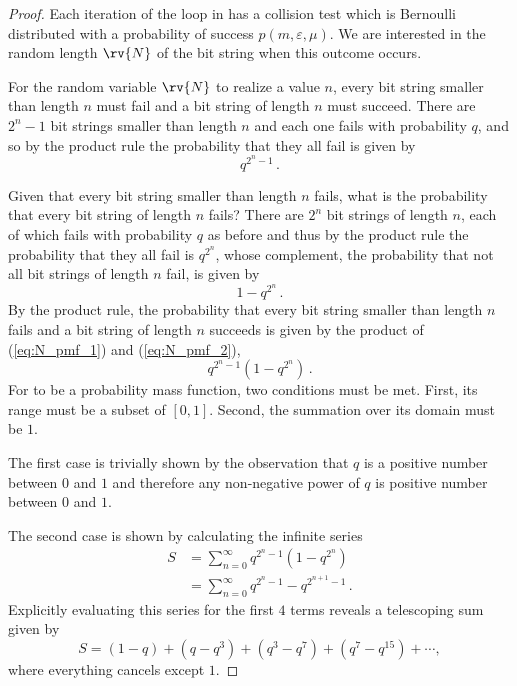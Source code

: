 \documentclass{article}
\begin{document}
\begin{proof}
Each iteration of the loop in  has a collision test which is Bernoulli distributed with a probability of success $p(m,\varepsilon,\mu)$. We are interested in the random length $\rv{N}$ of the bit string when this outcome occurs.

For the random variable $\rv{N}$ to realize a value $n$, every bit string smaller than length $n$ must fail and a bit string of length $n$ must succeed. There are $2^n-1$ bit strings smaller than length $n$ and each one fails with probability $q$, and so by the product rule the probability that they all fail is given by
\begin{equation}
\label{eq:N_pmf_1}
    q^{2^n - 1}\,.
\end{equation}

Given that every bit string smaller than length $n$ fails, what is the probability that every bit string of length $n$ fails? There are $2^n$ bit strings of length $n$, each of which fails with probability $q$ as before and thus by the product rule the probability that they all fail is $q^{2^n}$, whose complement, the probability that not all bit strings of length $n$ fail, is given by
\begin{equation}
\label{eq:N_pmf_2}
    1 - q^{2^n}\,.
\end{equation}
By the product rule, the probability that every bit string smaller than length $n$ fails and a bit string of length $n$ succeeds is given by the product of (\ref{eq:N_pmf_1}) and (\ref{eq:N_pmf_2}),
\begin{equation}
\label{eq:prob_is_mass}
    q^{2^n-1}\left(1 - q^{2^n}\right)\,.
\end{equation}
For  to be a probability mass function, two conditions must be met. First, its range must be a subset of $[0,1]$. Second, the summation over its domain must be $1$.

The first case is trivially shown by the observation that $q$ is a positive number between $0$ and $1$ and therefore any non-negative power of $q$ is positive number between $0$ and $1$.

The second case is shown by calculating the infinite series
\begin{align}
    S &= \sum_{n=0}^{\infty} q^{2^n-1}\left(1-q^{2^n}\right)\\
      &= \sum_{n=0}^{\infty} q^{2^n-1} - q^{2^{n+1}-1}\,.
\end{align}
Explicitly evaluating this series for the first $4$ terms reveals a telescoping sum given by
\begin{equation}
    S = (1 - q) + (q - q^3) + (q^3 - q^7) + (q^7 - q^{15}) + \cdots,
\end{equation}
where everything cancels except $1$.
\end{proof}
\end{document}
